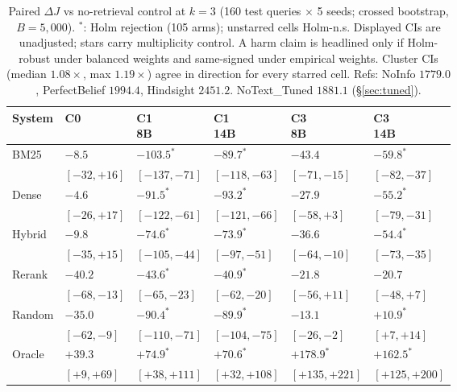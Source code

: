 \begin{table}[t]
\centering
\caption{Paired $\Delta J$ vs no-retrieval control at $k=3$ (160 test queries $\times$ 5 seeds; crossed bootstrap, $B=5{,}000$). $^*$: Holm rejection (105 arms); unstarred cells Holm-n.s. Displayed CIs are unadjusted; stars carry multiplicity control. A harm claim is headlined only if Holm-robust under balanced weights and same-signed under empirical weights. Cluster CIs (median $1.08\times$, max $1.19\times$) agree in direction for every starred cell. Refs: NoInfo $1779.0$, PerfectBelief $1994.4$, Hindsight $2451.2$. NoText\_Tuned $1881.1$ (\S\ref{sec:tuned}).}
\label{tab:utility}
{\small\setlength{\tabcolsep}{1pt}\renewcommand{\arraystretch}{1.0}
\begin{tabular}{@{}>{\raggedright\arraybackslash}p{1.35cm}*{5}{>{\centering\arraybackslash}p{1.85cm}}@{}}
\toprule
System & C0 & \shortstack{C1\\8B} & \shortstack{C1\\14B} & \shortstack{C3\\8B} & \shortstack{C3\\14B} \\
\midrule
BM25 & $-8.5$ & $-103.5^*$ & $-89.7^*$ & $-43.4$ & $-59.8^*$ \\
 & $[-32,+16]$ & $[-137,-71]$ & $[-118,-63]$ & $[-71,-15]$ & $[-82,-37]$ \\
\addlinespace[1pt]
Dense & $-4.6$ & $-91.5^*$ & $-93.2^*$ & $-27.9$ & $-55.2^*$ \\
 & $[-26,+17]$ & $[-122,-61]$ & $[-121,-66]$ & $[-58,+3]$ & $[-79,-31]$ \\
\addlinespace[1pt]
Hybrid & $-9.8$ & $-74.6^*$ & $-73.9^*$ & $-36.6$ & $-54.4^*$ \\
 & $[-35,+15]$ & $[-105,-44]$ & $[-97,-51]$ & $[-64,-10]$ & $[-73,-35]$ \\
\addlinespace[1pt]
Rerank & $-40.2$ & $-43.6^*$ & $-40.9^*$ & $-21.8$ & $-20.7$ \\
 & $[-68,-13]$ & $[-65,-23]$ & $[-62,-20]$ & $[-56,+11]$ & $[-48,+7]$ \\
\addlinespace[1pt]
Random & $-35.0$ & $-90.4^*$ & $-89.9^*$ & $-13.1$ & $+10.9^*$ \\
 & $[-62,-9]$ & $[-110,-71]$ & $[-104,-75]$ & $[-26,-2]$ & $[+7,+14]$ \\
\addlinespace[1pt]
Oracle & $+39.3$ & $+74.9^*$ & $+70.6^*$ & $+178.9^*$ & $+162.5^*$ \\
 & $[+9,+69]$ & $[+38,+111]$ & $[+32,+108]$ & $[+135,+221]$ & $[+125,+200]$ \\
\bottomrule
\end{tabular}
}
\end{table}
